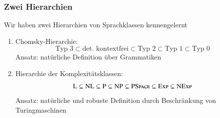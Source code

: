 \documentclass[aspectratio=1610,onlymath]{beamer}
\begin{document}
\begin{frame}\frametitle{Zwei Hierarchien}

Wir haben zwei Hierarchien von Sprachklassen kennengelernt\bigskip

\begin{enumerate}[(1)]
\item \alert{Chomsky-Hierarchie:}
\[ \text{Typ 3}\subset \text{det. kontextfrei}\subset\text{Typ 2}\subset\text{Typ 1}\subset\text{Typ 0}\]
Ansatz: natürliche Definition über Grammatiken\bigskip
\item \alert{Hierarchie der Komplexitätsklassen:}
\[{\textsc{L}}\subseteq{\textsc{NL}}\subseteq {\textsc{P}}\subseteq{\textsc{NP}}\subseteq{\textsc{PSpace}}\subseteq {\textsc{Exp}}\subseteq {\textsc{NExp}}\]
Ansatz: natürliche und robuste Definition durch Beschränkung von Turingmaschinen
\end{enumerate}

\end{frame}
\end{document}
